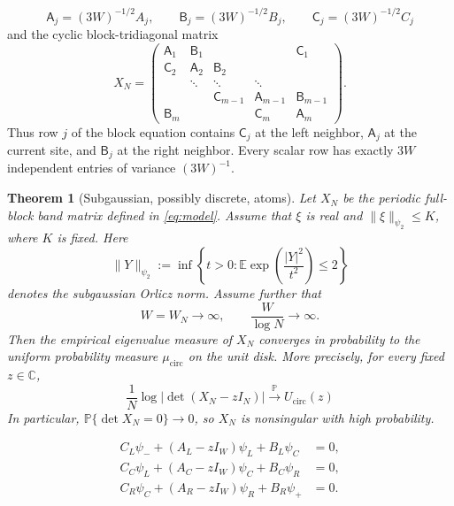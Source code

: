 \documentclass[10pt,a4paper]{amsart}
\newtheorem{theorem}{Theorem}
\newcommand{\C}{\mathbb C}
\newcommand{\E}{\mathbb E}
\newcommand{\Pp}{\mathbb P}
\newcommand{\cir}{\mathrm{circ}}
\begin{document}
\[
 \mathsf A_j=(3W)^{-1/2}A_j,\qquad
 \mathsf B_j=(3W)^{-1/2}B_j,\qquad
 \mathsf C_j=(3W)^{-1/2}C_j
\]
and the cyclic block-tridiagonal matrix
\begin{equation}
 X_N=
 \begin{pmatrix}
  \mathsf A_1&\mathsf B_1&&&\mathsf C_1\\
  \mathsf C_2&\mathsf A_2&\mathsf B_2&&\\
  &\ddots&\ddots&\ddots&\\
  &&\mathsf C_{m-1}&\mathsf A_{m-1}&\mathsf B_{m-1}\\
  \mathsf B_m&&&\mathsf C_m&\mathsf A_m
 \end{pmatrix}.
 \label{eq:model}
\end{equation}
Thus row \(j\) of the block equation contains
\(\mathsf C_j\) at the left neighbor, \(\mathsf A_j\) at the current
site, and \(\mathsf B_j\) at the right neighbor.  Every scalar row has
exactly \(3W\) independent entries of variance \((3W)^{-1}\).

\begin{theorem}[Subgaussian, possibly discrete, atoms]
\label{thm:main}
Let \(X_N\) be the periodic full-block band matrix defined in
\eqref{eq:model}.  Assume that \(\xi\) is real and
\(\|\xi\|_{\psi_2}\le K\), where \(K\) is fixed.  Here
\[
 \|Y\|_{\psi_2}:=\inf\left\{t>0:
   \E\exp\left(\frac{|Y|^2}{t^2}\right)\leq2\right\}
\]
denotes the subgaussian Orlicz norm.  Assume further that
\begin{equation}
 W=W_N\longrightarrow\infty,
 \qquad \frac{W}{\log N}\longrightarrow\infty.
 \label{eq:bandwidth}
\end{equation}
Then the empirical eigenvalue measure of \(X_N\) converges in probability
to the uniform probability measure \(\mu_{\cir}\) on the unit disk.
More precisely, for every fixed \(z\in\C\),
\begin{equation}
 \frac1N\log|\det(X_N-zI_N)|
 \xrightarrow{\mathbb P}
 U_{\cir}(z)
 \label{eq:logdet-goal}
\end{equation}
In particular, \(\Pp\{\det X_N=0\}\to0\), so \(X_N\) is nonsingular
with high probability.
\end{theorem}

\begin{align}
 C_L\psi_-+(A_L-zI_W)\psi_L+B_L\psi_C&=0,
 \label{eq:local-packet-left}\\
 C_C\psi_L+(A_C-zI_W)\psi_C+B_C\psi_R&=0,
 \label{eq:local-packet-centre}\\
 C_R\psi_C+(A_R-zI_W)\psi_R+B_R\psi_+&=0.
 \label{eq:local-packet-right}
\end{align}
\end{document}
